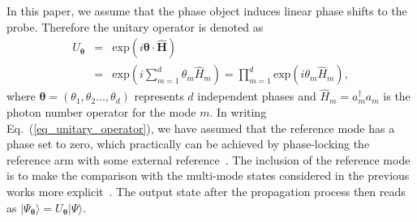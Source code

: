 \documentclass[aps,pra,reprint,showpacs,groupedaddress]{revtex4-1}
\begin{document}
In this paper, we assume that the phase object induces linear phase shifts to the probe. Therefore the unitary operator is denoted as
\begin{eqnarray}
    U_{\boldsymbol{\theta}}
    &=&
    \text{exp}\left( i \boldsymbol{\theta} \cdot \boldsymbol{\hat{H}} \right) \\
    &=&
    \text{exp}\left(i \sum_{m=1}^{d} \theta_m \hat{H}_{m}\right)=\prod_{m=1}^{d}\text{exp}\left(i \theta_m \hat{H}_{m}\right),
\label{eq_unitary_operator}
\end{eqnarray}
where $\boldsymbol{\theta}=(\theta_1,\theta_2...,\theta_d)$ represents $d$ independent phases and $\hat{H}_{m}=a_m^\dagger a_m$ is the photon number operator for the mode $m$.
In writing Eq.~(\ref{eq_unitary_operator}), we have assumed that the reference mode has a phase set to zero, which practically can be achieved by phase-locking the reference arm with some external reference~\cite{Jarzyna-etal2012}. The inclusion of the reference mode is to make the comparison with the multi-mode states considered in the previous works more explicit~\cite{Liu2016_multi_GeneralizedECS_lnl, Humphreys2013_multi_NOON_l}.
The output state after the propagation process then reads as $|\Psi_{\boldsymbol{\theta}}\rangle=U_{\boldsymbol{\theta}}|\Psi\rangle$.
\end{document}
